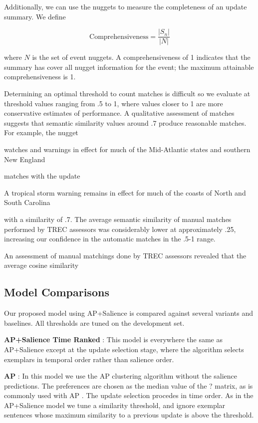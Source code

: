Additionally, we can use the nuggets to measure the completeness of an update 
summary. We define

\[ \mathrm{Comprehensiveness} = \frac{|S_n|}{|N|}\]

where $N$ is the set of event nuggets.
A comprehensiveness of 1 indicates that the summary has cover 
all nugget information for the event; the maximum
attainable comprehensiveness is 1.

Determining an optimal threshold to count matches is difficult so 
we evaluate at 
threshold values ranging
from .5 to 1, where values closer to 1 are more conservative estimates of
performance.
A qualitative assessment of matches 
suggests that semantic similarity values around .7 produce reasonable matches.
For example, the nugget 
\begin{blockquote}
watches and warnings in effect for much of the Mid-Atlantic states and 
southern New England 
\end{blockquote}
\noindent
matches with the update 
\begin{blockquote}
A tropical storm warning remains in effect for much of the coasts 
of North and South Carolina\end{blockquote}
\noindent
with a similarity of .7. 
The average semantic similarity of manual matches performed 
by TREC assessors was considerably lower at approximately .25, increasing
our confidence in the automatic matches in the .5-1 range.

An assessment of manual matchings done by TREC 
assessors revealed that the average cosine similarity 

\subsection{Model Comparisons}

Our proposed model using AP+Salience is compared against several variants and baselines. All thresholds
are tuned on the development set.

\textbf{AP+Salience Time Ranked} : This model is everywhere the same as AP+Salience except at the update selection stage, 
where the algorithm selects exemplars in temporal order rather than salience order. 

\textbf{AP} : In this model we use the AP clustering algorithm without the salience predictions.
The preferences are chosen as the median value of the ? matrix, as is commonly used with AP \cite{?}.
The update selection procedes in time order. As in the AP+Salience model we tune a similarity threshold,
and ignore exemplar sentences whose maximum similarity to a previous update is above the threshold.

